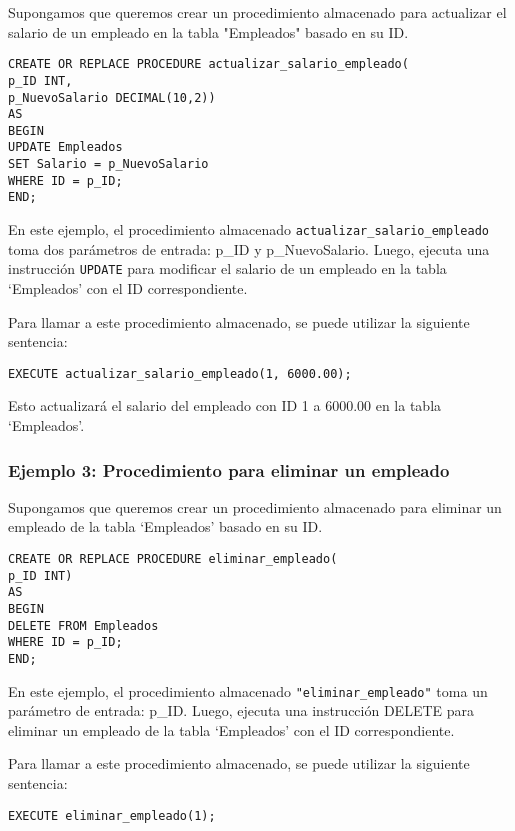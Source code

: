 \documentclass[executivepaper]{article}
\begin{document}
Supongamos que queremos crear un procedimiento almacenado para actualizar el salario de un empleado en la tabla "Empleados" basado en su ID.

\begin{lstlisting}
CREATE OR REPLACE PROCEDURE actualizar_salario_empleado(
p_ID INT,
p_NuevoSalario DECIMAL(10,2))
AS
BEGIN
UPDATE Empleados
SET Salario = p_NuevoSalario
WHERE ID = p_ID;
END;
\end{lstlisting}

En este ejemplo, el procedimiento almacenado \lstinline{actualizar_salario_empleado} toma dos parámetros de entrada: p\_ID y p\_NuevoSalario. Luego, ejecuta una instrucción \lstinline{UPDATE} para modificar el salario de un empleado en la tabla \enquote*{Empleados} con el ID correspondiente.

Para llamar a este procedimiento almacenado, se puede utilizar la siguiente sentencia:

\begin{lstlisting}
EXECUTE actualizar_salario_empleado(1, 6000.00);
\end{lstlisting}

Esto actualizará el salario del empleado con ID 1 a 6000.00 en la tabla \enquote*{Empleados}.

\subsubsection*{Ejemplo 3: Procedimiento para eliminar un empleado}

Supongamos que queremos crear un procedimiento almacenado para eliminar un empleado de la tabla \enquote*{Empleados} basado en su ID.

\begin{lstlisting}
CREATE OR REPLACE PROCEDURE eliminar_empleado(
p_ID INT)
AS
BEGIN
DELETE FROM Empleados
WHERE ID = p_ID;
END;
\end{lstlisting}

En este ejemplo, el procedimiento almacenado \lstinline{"eliminar_empleado"} toma un parámetro de entrada: p\_ID. Luego, ejecuta una instrucción DELETE para eliminar un empleado de la tabla \enquote*{Empleados} con el ID correspondiente.

Para llamar a este procedimiento almacenado, se puede utilizar la siguiente sentencia:

\begin{lstlisting}
EXECUTE eliminar_empleado(1);
\end{lstlisting}
\end{document}
